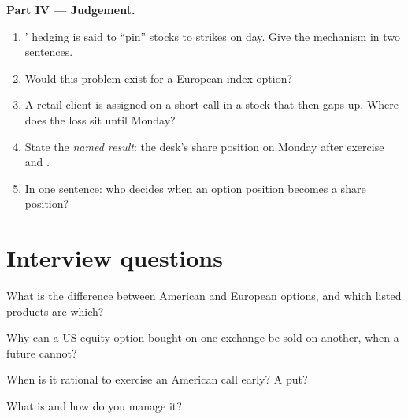 \begin{problem}
\medskip\noindent\textbf{Part IV --- Judgement.}
\begin{enumerate}[resume]
\item {}' hedging is said to ``pin'' stocks to strikes on 
day. Give the mechanism in two sentences.
\item Would this problem exist for a  European index option?
\item A retail client is assigned on a short call in a stock that then gaps
up. Where does the loss sit until Monday?
\item State the \emph{named result}: the desk's share position on Monday
after exercise and .
\item In one sentence: who decides when an option position becomes a share
position?
\end{enumerate}
\end{problem}

\section{Interview questions}

\begin{interviewq}\label{iq:m1:option-contracts-and-exchanges:1}
What is the difference between American and European options, and which
listed products are which?
\end{interviewq}

\begin{interviewq}\label{iq:m1:option-contracts-and-exchanges:2}
Why can a US equity option bought on one exchange be sold on another, when a
future cannot?
\end{interviewq}

\begin{interviewq}\label{iq:m1:option-contracts-and-exchanges:3}
When is it rational to exercise an American call early? A put?
\end{interviewq}

\begin{interviewq}\label{iq:m1:option-contracts-and-exchanges:4}
What is  and how do you manage it?
\end{interviewq}

